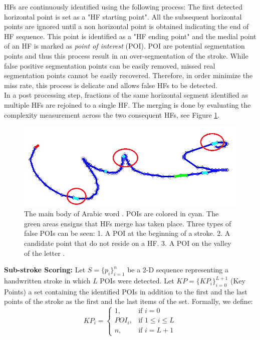 \documentclass[journal,compsoc]{IEEEtran}
\begin{document}
HFs are continuously identified using the following process: 
The first detected horizontal point is set as a "HF starting point". 
All the subsequent horizontal points are ignored until a non horizontal point is obtained indicating the end of HF sequence. 
This point is identified as a "HF ending point" and the medial point of an HF is marked as \emph{point of interest} (POI). 
POI are potential segmentation points and thus this process result in an over-segmentation of the stroke. 
While false positive segmentation points can be easily removed, missed real segmentation points cannot be easily recovered. 
Therefore, in order minimize the miss rate, this process is delicate and allows false HFs to be detected.\\

In a post processing step, fractions of the same horizontal segment identified as multiple HFs are rejoined to a single HF. 
The merging is done by evaluating the complexity measurement across the two consequent HFs, see Figure \ref{fig:candidate_in_no_horizontal}.\\

\begin{figure}
\centering
\includegraphics[width=0.5\columnwidth]{./figures/candidate_in_no_horizontal}
\caption{The main body of Arabic word . POIs are colored in cyan. The green areas ensigns that HFs merge has taken place. Three types of false POIs can be seen: 1. A POI at the beginning of a stroke. 2. A candidate point that do not reside on a HF. 3. A POI on the valley of the letter . }
\label{fig:candidate_in_no_horizontal}
\end{figure}

\textbf{Sub-stroke Scoring:}
Let $S=\{p_{i}\}_{i=1}^{n}$ be a 2-D sequence representing a handwritten stroke in which $L$ POIs were detected. 
Let $KP=\{KP_{i}\}_{i=0}^{L+1}$ (Key Points) a set containing the identified POIs in addition to the first and the last points of the stroke as the first and the last items of the set.
Formally, we define: 
\begin{equation}
KP_{i} =\begin{cases}    1		, & \mbox{if } i=0 \\
							   POI_{i}	, & \mbox{if } 1\leq i \leq L \\
							   n    , & \mbox{if } i=L+1 
			\end{cases}				
\end{equation}
\end{document}
